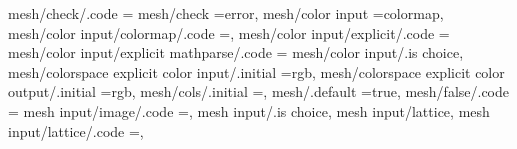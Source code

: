 mesh/check/.code                                                   ={                                                                                                                                 
mesh/check                                                         =error,                                                                                                                             
mesh/color input                                                   =colormap,                                                                                                                          
mesh/color input/colormap/.code                                    =\def\pgfplotsplothandlermesh@colorinput{0},                                                                                       
mesh/color input/explicit/.code                                    ={                                                                                                                                 
mesh/color input/explicit mathparse/.code                          ={                                                                                                                                 
mesh/color input/.is choice,
mesh/colorspace explicit color input/.initial                      =rgb,                                                                                                                               
mesh/colorspace explicit color output/.initial                     =rgb,                                                                                                                               
mesh/cols/.initial                                                 =,                                                                                                                                  
mesh/.default                                                      =true,                                                                                                                              
mesh/false/.code                                                   ={                                                                                                                                  
mesh input/image/.code                                             ={\def\pgfplotsplothandlermesh@matrixinput{2}},                                                                                     
mesh input/.is choice,
mesh input/lattice,
mesh input/lattice/.code                                           ={\def\pgfplotsplothandlermesh@matrixinput{1}},                                                                                     
}}}}
